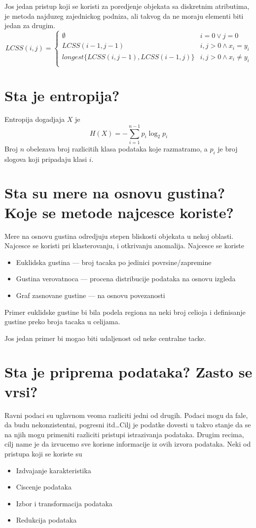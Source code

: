 \documentclass[a4paper]{article}
\begin{document}
Jos jedan pristup koji se koristi za poredjenje objekata sa diskretnim atributima, je metoda
najduzeg zajednickog podniza, ali takvog da ne moraju elementi biti jedan za drugim.
\[
    LCSS(i, j) =
    \begin{cases}
        \emptyset & i = 0 \lor j = 0 \\
        LCSS(i-1, j-1) & i,j > 0 \land x_i = y_i \\
        longest\{LCSS(i, j-1), LCSS(i-1, j)\} & i,j > 0 \land x_i \neq y_i \\
    \end{cases}
\]

\section{Sta je entropija?}
Entropija dogadjaja \(X\) je
\[
    H(X) = - \sum_{i=1}^{n-1}p_i\log_{2}p_i
\]
Broj \(n\) obelezava broj razlicitih klasa podataka koje razmatramo, a \(p_i\) je broj slogova
koji pripadaju klasi \(i\).

\section{Sta su mere na osnovu gustina? Koje se metode najcesce koriste?}
Mere na osnovu gustina odredjuju stepen bliskosti objekata u nekoj oblasti. Najcesce se koristi pri
klasterovanju, i otkrivanju anomalija. Najcesce se koriste
\begin{itemize}
        \item Euklidska gustina --- broj tacaka po jedinici povrsine/zapremine
        \item Gustina verovatnoca --- procena distribucije podataka na osnovu izgleda
        \item Graf zasnovane gustine --- na osnovu povezanosti
\end{itemize}
Primer euklidske gustine bi bila podela regiona na neki broj celioja i definisanje gustine preko
broja tacaka u celijama.

Jos jedan primer bi mogao biti udaljenost od neke centralne tacke.

\section{Sta je priprema podataka? Zasto se vrsi?}
Ravni podaci su uglavnom veoma razliciti jedni od drugih. Podaci mogu da fale, da budu
nekonzistentni, pogresni itd\ldots Cilj je podatke dovesti u takvo stanje da se na njih mogu
primeniti razliciti pristupi istrazivanja podataka. Drugim recima, cilj name je da izvucemo sve
korisne informacije iz ovih izvora podataka. Neki od pristupa koji se koriste su
\begin{itemize}
    \item Izdvajanje karakteristika
    \item Ciscenje podataka
    \item Izbor i transformacija podataka
    \item Redukcija podataka
\end{itemize}
\end{document}
